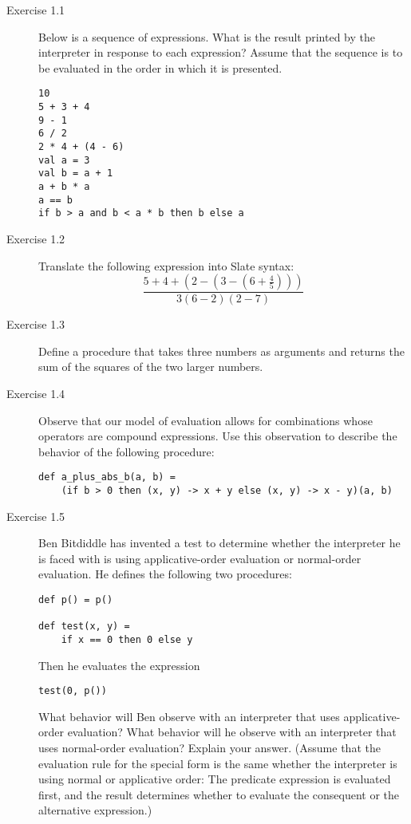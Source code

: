 \begin{description}
\item[Exercise 1.1] Below is a sequence of expressions. What is the result printed by the interpreter in response to each expression? Assume that the sequence is to be evaluated in the order in which it is presented.

\begin{lstlisting}
10
5 + 3 + 4
9 - 1
6 / 2
2 * 4 + (4 - 6)
val a = 3
val b = a + 1
a + b * a
a == b
if b > a and b < a * b then b else a
\end{lstlisting}

\item[Exercise 1.2] Translate the following expression into Slate syntax:
\begin{equation}
\frac{5 + 4 + (2 - (3 - (6 + \frac{4}{5})))}{3(6 - 2)(2 - 7)}
\end{equation}

\item[Exercise 1.3] Define a procedure that takes three numbers as arguments and returns the sum of the squares of the two larger numbers.

\item[Exercise 1.4] Observe that our model of evaluation allows for combinations whose operators are compound expressions. Use this observation to describe the behavior of the following procedure:

\begin{lstlisting}
def a_plus_abs_b(a, b) =
    (if b > 0 then (x, y) -> x + y else (x, y) -> x - y)(a, b)
\end{lstlisting}

\item[Exercise 1.5] Ben Bitdiddle has invented a test to determine whether the interpreter he is faced with is using applicative-order evaluation or normal-order evaluation. He defines the following two procedures:

\begin{lstlisting}
def p() = p()

def test(x, y) =
    if x == 0 then 0 else y
\end{lstlisting}

Then he evaluates the expression

\begin{lstlisting}
test(0, p())
\end{lstlisting}

What behavior will Ben observe with an interpreter that uses applicative-order evaluation? What behavior will he observe with an interpreter that uses normal-order evaluation? Explain your answer. (Assume that the evaluation rule for the special form  is the same whether the interpreter is using normal or applicative order: The predicate expression is evaluated first, and the result determines whether to evaluate the consequent or the alternative expression.)
\end{description}


